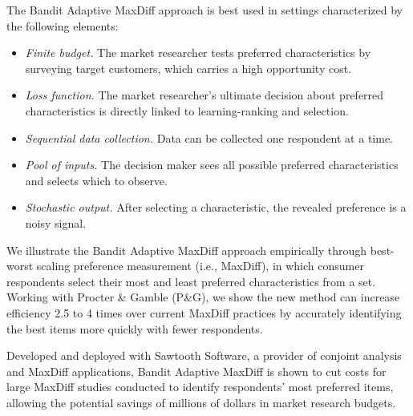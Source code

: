 \documentclass[a4paper,11pt]{article}
\begin{document}
The Bandit Adaptive MaxDiff approach is best used in settings characterized by the following elements:
\begin{itemize}
\item \emph{Finite budget.} The market researcher tests preferred characteristics by surveying target customers, which carries a high opportunity cost.
\item \emph{Loss function.} The market researcher's ultimate decision about preferred characteristics is directly linked to learning-ranking and selection.
\item \emph{Sequential data collection.} Data can be collected one respondent at a time.
\item \emph{Pool of inputs.} The decision maker sees all possible preferred characteristics and selects which to observe.
\item \emph{Stochastic output.} After selecting a characteristic, the revealed preference is a noisy signal.
\end{itemize}

We illustrate the Bandit Adaptive MaxDiff approach empirically through best-worst scaling preference measurement (i.e., MaxDiff), in which consumer respondents select their most and least preferred characteristics from a set. Working with Procter \& Gamble (P\&G), we show the new method can increase efficiency 2.5 to 4 times over current MaxDiff practices by accurately identifying the best items more quickly with fewer respondents. 

Developed and deployed with Sawtooth Software, a provider of conjoint analysis and MaxDiff applications, Bandit Adaptive MaxDiff is shown to cut costs for large MaxDiff studies conducted to identify respondents’ most preferred items, allowing the potential savings of millions of dollars in market research budgets. 







\end{document}

